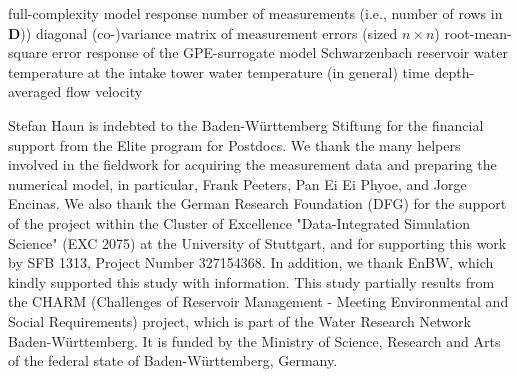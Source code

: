 \documentclass[draft,linenumbers,onecolumn]{agujournal2019} %
\begin{document}
\begin{notation}
	 full-complexity model response 
	 number of measurements (i.e., number of rows in $\mathbf{D}$))
	 diagonal (co-)variance matrix of measurement errors (sized $n\times n$)
	 root-mean-square error
	 response of the GPE-surrogate model
	 Schwarzenbach reservoir 
	 water temperature at the intake tower 
	 water temperature (in general)
	 time
	 depth-averaged flow velocity
\end{notation}




%
%
%
%
%
%



\acknowledgments

Stefan Haun is indebted to the Baden-W{\"u}rttemberg Stiftung for the financial support from the Elite program for Postdocs. We thank the many helpers involved in the fieldwork for acquiring the measurement data and preparing the numerical model, in particular, Frank Peeters, Pan Ei Ei Phyoe, and Jorge Encinas. We also thank the German Research Foundation (DFG) for the support of the project within the Cluster of Excellence "Data-Integrated Simulation Science" (EXC 2075) at the University of Stuttgart, and for supporting this work by SFB 1313, Project Number 327154368.
In addition, we thank EnBW, which kindly supported this study with information. This study partially results from the CHARM (Challenges of Reservoir Management - Meeting Environmental and Social Requirements) project, which is part of the Water Research Network Baden-Württemberg. It is funded by the Ministry of Science, Research and Arts of the federal state of Baden-Württemberg, Germany.
\end{document}

